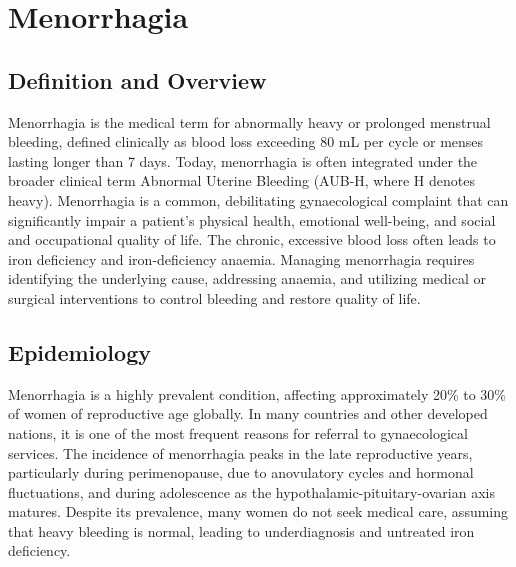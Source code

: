 \chapter{Menorrhagia}

\section*{Definition and Overview}
Menorrhagia is the medical term for abnormally heavy or prolonged menstrual bleeding, defined clinically as blood loss exceeding 80 mL per cycle or menses lasting longer than 7 days. Today, menorrhagia is often integrated under the broader clinical term Abnormal Uterine Bleeding (AUB-H, where H denotes heavy). Menorrhagia is a common, debilitating gynaecological complaint that can significantly impair a patient's physical health, emotional well-being, and social and occupational quality of life. The chronic, excessive blood loss often leads to iron deficiency and iron-deficiency anaemia. Managing menorrhagia requires identifying the underlying cause, addressing anaemia, and utilizing medical or surgical interventions to control bleeding and restore quality of life.

\section*{Epidemiology}
Menorrhagia is a highly prevalent condition, affecting approximately 20\% to 30\% of women of reproductive age globally. In many countries and other developed nations, it is one of the most frequent reasons for referral to gynaecological services. The incidence of menorrhagia peaks in the late reproductive years, particularly during perimenopause, due to anovulatory cycles and hormonal fluctuations, and during adolescence as the hypothalamic-pituitary-ovarian axis matures. Despite its prevalence, many women do not seek medical care, assuming that heavy bleeding is normal, leading to underdiagnosis and untreated iron deficiency.

